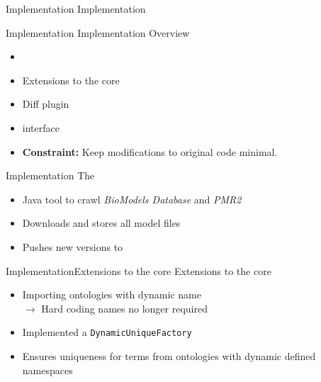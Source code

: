 \begin{frame}{Implementation}{}
	\centering
	\LARGE Implementation
\end{frame}

\begin{frame}{Implementation}{}
	{\Large Implementation Overview}
	\\[2.5em]
	\begin{itemize}
		\item \modelcrawler
		\item Extensions to the \masymos core
		\item Diff plugin
		\item \rest interface\\[2em]
		\item \textbf{Constraint:} Keep modifications to original \masymos code minimal.
	\end{itemize}
\end{frame}

\begin{frame}{Implementation}{\modelcrawler}
	{\Large The \modelcrawler}
	\\[2.5em]
	\begin{itemize}
		\item Java tool to crawl \emph{BioModels Database} and \emph{PMR2}
		\item Downloads and stores all model files
		\item Pushes new versions to \masymos
	\end{itemize}
\end{frame}

\begin{frame}{Implementation}{Extensions to the \masymos core}
	{\Large Extensions to the \masymos core}
	\\[2.5em]
	\begin{itemize}
		\item Importing ontologies with dynamic name\\
			$\rightarrow$ Hard coding names no longer required
		\item Implemented a \texttt{DynamicUniqueFactory}
		\item Ensures uniqueness for terms from ontologies with dynamic defined namespaces
	\end{itemize}
\end{frame}

